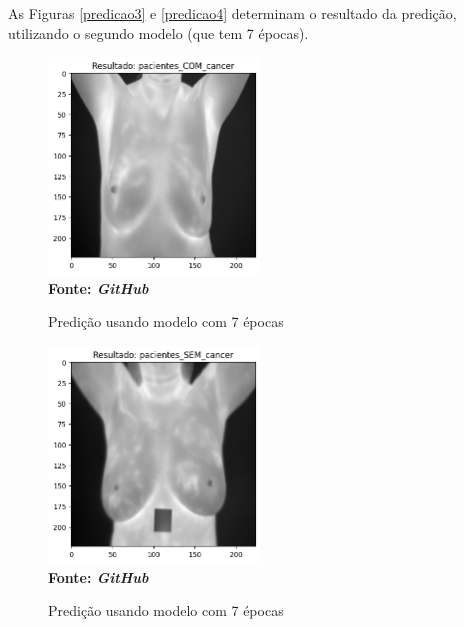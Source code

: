 As Figuras \ref{predicao3} e \ref{predicao4} determinam o resultado da predição, utilizando o segundo modelo (que tem 7 épocas). 

\begin{figure}[ht]
 	\centering	
 	\caption[\hspace{0.1cm}Grade Computacional.]{Predição usando modelo com 7 épocas}
 	\vspace{-0.4cm}
 	\includegraphics[width=0.5\textwidth]{figuras/model7_pred1.png}
 	\captionsetup{justification=centering}
	\vspace{-0.2cm}
     \\\textbf{\footnotesize Fonte: \textit{GitHub}}
	\label{fig:predicao3}
\end{figure}

\begin{figure}[ht]
 	\centering	
 	\caption[\hspace{0.1cm}Grade Computacional.]{Predição usando modelo com 7 épocas}
 	\vspace{-0.4cm}
 	\includegraphics[width=0.5\textwidth]{figuras/model7_pred2.png}
 	\captionsetup{justification=centering}
	\vspace{-0.2cm}
     \\\textbf{\footnotesize Fonte: \textit{GitHub}}
	\label{fig:predicao4}
\end{figure}

